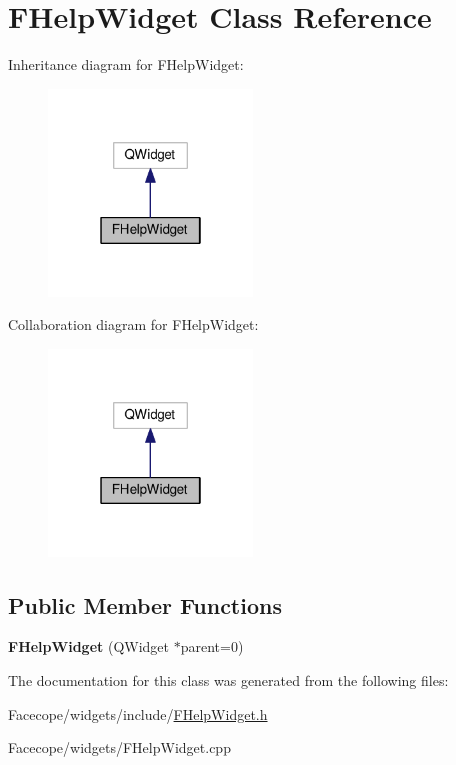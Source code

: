 \hypertarget{classFHelpWidget}{}\section{F\+Help\+Widget Class Reference}
\label{classFHelpWidget}


Inheritance diagram for F\+Help\+Widget\+:
\nopagebreak
\begin{figure}[H]
\begin{center}
\leavevmode
\includegraphics[width=154pt]{classFHelpWidget__inherit__graph}
\end{center}
\end{figure}


Collaboration diagram for F\+Help\+Widget\+:
\nopagebreak
\begin{figure}[H]
\begin{center}
\leavevmode
\includegraphics[width=154pt]{classFHelpWidget__coll__graph}
\end{center}
\end{figure}
\subsection*{Public Member Functions}
\begin{DoxyCompactItemize}
\item 
\mbox{\label{classFHelpWidget_aa30f30781babf7d9ba69a72ca7830fcf}} 
{\bfseries F\+Help\+Widget} (Q\+Widget $\ast$parent=0)
\end{DoxyCompactItemize}


The documentation for this class was generated from the following files\+:\begin{DoxyCompactItemize}
\item 
Facecope/widgets/include/\hyperlink{FHelpWidget_8h}{F\+Help\+Widget.\+h}\item 
Facecope/widgets/F\+Help\+Widget.\+cpp\end{DoxyCompactItemize}
